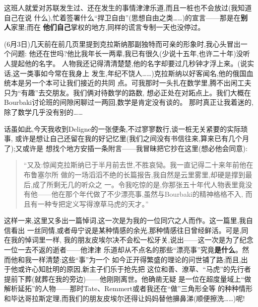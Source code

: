 这班人就爱对苏联发生过、还在发生的事情津津乐道,而且一桩也不会放过(我知道自己在说
什么),忙着签署什么“捍卫自由”(思想自由之类……)的宣言——那是在\textbf{别人}家里;而在
\textbf{他们自己}掌权的地方,同样的谎言专制一天也没停过。

(6月3日)几天前在前几页里提到克拉斯纳那副独特而可亲的形象时,我心头冒出一个问题:
他还在世吗?他比我年长一两辈,我已有很久(少说十五年,也许二十年)没听人提起他的名字。
人物我还记得清清楚楚,他的名字却要过几秒钟才浮上来。(说实话,这一类事如今常在我身上
发生,年纪不饶人……)克拉斯纳以好客闻名,他的俄国血统本是另一个本可让我们接近的共同
点。可我那时一头扎在数学里,腾不出闲工夫只为“有趣”去交朋友。我们俩对待数学的路数,
想必正处在对跖点上。我们大概在Bourbaki讨论班的间隙闲聊过一两回,数学是肯定没有谈的。
那时真正让我着迷的,除了数学几乎没有别的……

\pmark{}话虽如此,今天我收到Deligne的一张便条,不过寥寥数行,谈一桩无关紧要的实际琐事,
或许是想让自己还留在我的好记忆里(我们之间没有书信往来,算来已有几个月了);又或许是
想找个地方安插一条附言——我冒昧把它抄在这里(想必他会同意):

\begin{quote}
“又及:惊闻克拉斯纳已于半月前去世,不胜哀恸。我一直记得二十来年前他在布鲁塞尔所
做的一场滔滔不绝的长篇报告,我自然是云里雾里,却硬是撑到最后,成了所剩无几的听众之
一。令我吃惊的是,你那张五十年代人物表里竟没有他——他在那个年代做了不少漂亮事,虽然与Bourbaki的精神格格不入,
而且有一种专把定义写得潦草马虎的天才。”
\end{quote}

这样一来,这里又多出一篇悼词,这一次是为我的一位同穴之人而作。这一篇里,我自信看出
一丝同情,或者毋宁说是某种情感的余光,那种情感往日曾经鲜活。可是,同在我的悼词里一样,
我的朋友皮埃尔决不会松一松牙关,说出——这一次是为了纪念一位一去不返的逝者——他津津
乐道却从不点名的那些“漂亮事”究竟\textbf{是什么}。然而他和我一样清楚:这些“事”为一个
如今正开得繁盛的理论的问世铺了路;而且,出于他或许心知肚明的原因,新主子们乐于抢先把
这位和善、潦草、“马虎”的先行者提前下葬(就葬在我的旁边)——他刚刚离世。他确凿无疑
是一位在超度量域上“做解析延拓”的人物——那时Tate、Remmert或者我还在“做”三角形全等
的种种情形和毕达哥拉斯定理,而我们的朋友皮埃尔还得让妈妈替他擤鼻涕(顺便擦洗……)呢!

